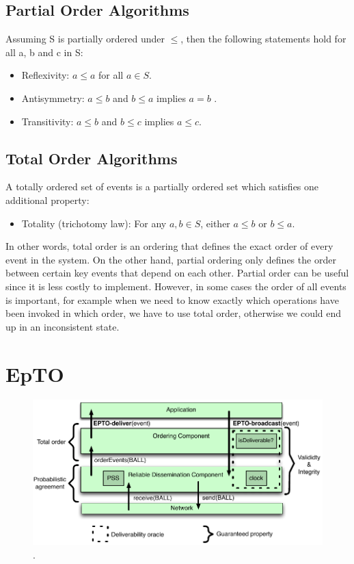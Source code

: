 \documentclass[10pt,conference,a4paper]{IEEEtran}
\begin{document}
\subsection{Partial Order Algorithms}
Assuming S is partially ordered under $\leq$, then the following statements hold for all a, b and c in S:
\begin{itemize}
	\item Reflexivity: $a \leq a$ for all $a \in S$.
	\item Antisymmetry: $a \leq b$ and $b \leq a$ implies $a=b$ .
	\item Transitivity: $a \leq b$  and $b \leq c$  implies $a \leq c$.
\end{itemize}

\subsection{Total Order Algorithms}
A totally ordered set of events is a partially ordered set which satisfies one additional property:
\begin{itemize}
	\item Totality (trichotomy law): For any $a, b \in S$, either $a \leq b$  or $b \leq a$.
\end{itemize}
\par
In other words, total order is an ordering that defines the exact order of every event in the system. On the other hand, partial ordering only defines the order between certain key events that depend on each other. Partial order can be useful since it is less costly to implement. However, in some cases the order of all events is important, for example when we need to know exactly which operations have been invoked in which order, we have to use total order, otherwise we could end up in an inconsistent state.

\section{EpTO}
\begin{figure}
	\includegraphics[width=\linewidth]{figures/epto-architecture.png}
	\caption{\protect\footnotemark{}.}
	\label{fig:epto-architecture}
\end{figure}
\end{document}
